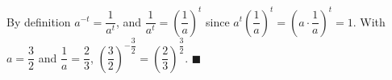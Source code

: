 By definition $a^{-t}=\dfrac1{a^t}$, and $\dfrac1{a^t}=\left(\dfrac1a\right)^t$ since $a^t\left(\dfrac1a\right)^t=\left(a\cdot\dfrac1a\right)^t=1$. With $a=\dfrac32$ and $\dfrac1a=\dfrac23$, $\left(\dfrac32\right)^{-\dfrac32}=\left(\dfrac23\right)^{\dfrac32}$. $\blacksquare$
